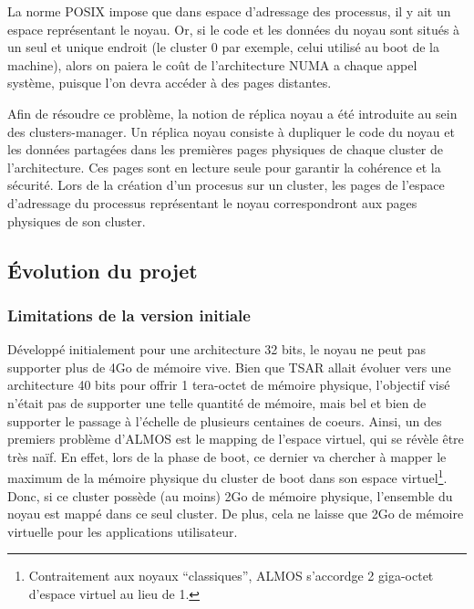       La norme POSIX impose que dans espace d'adressage des processus, il y ait
      un espace représentant le noyau. Or, si le code et les données du noyau
      sont situés à un seul et unique endroit (le cluster 0 par exemple, celui
      utilisé au boot de la machine), alors on paiera le coût de l'architecture
      NUMA a chaque appel système, puisque l'on devra accéder à des pages
      distantes.

      Afin de résoudre ce problème, la notion de réplica noyau a été introduite
      au sein des clusters-manager. Un réplica noyau consiste à dupliquer le
      code du noyau et les données partagées dans les premières pages physiques
      de chaque cluster de l'architecture. Ces pages sont en lecture seule pour
      garantir la cohérence et la sécurité. Lors de la création d'un procesus
      sur un cluster, les pages de l'espace d'adressage du processus
      représentant le noyau correspondront aux pages physiques de son cluster.


  \subsection{}



  \subsection{Évolution du projet}

    \subsubsection{Limitations de la version initiale}
    \label{subsec:unsolved}
    
      Développé initialement pour une architecture 32 bits, le noyau ne peut pas
      supporter plus de 4Go de mémoire vive. Bien que TSAR allait évoluer vers
      une architecture 40 bits pour offrir 1 tera-octet de mémoire physique,
      l'objectif visé n'était pas de supporter une telle quantité de mémoire,
      mais bel et bien de supporter le passage à l'échelle de plusieurs
      centaines de coeurs. Ainsi, un des premiers problème d'ALMOS est le
      mapping de l'espace virtuel, qui se révèle être très naïf. En effet, lors
      de la phase de boot, ce dernier va chercher à mapper le maximum de la
      mémoire physique du cluster de boot dans son espace
      virtuel\footnote{Contraitement aux noyaux ``classiques'', ALMOS s'accordge
        2 giga-octet d'espace virtuel au lieu de 1.}. Donc, si ce cluster
      possède (au moins) 2Go de mémoire physique, l'ensemble du noyau est mappé
      dans ce seul cluster. De plus, cela ne laisse que 2Go de mémoire virtuelle
      pour les applications utilisateur. 

